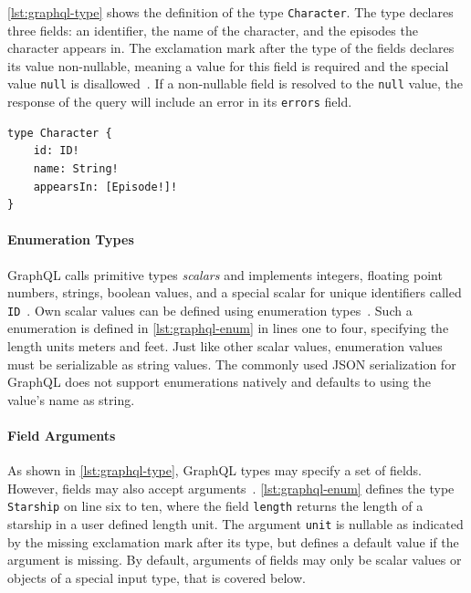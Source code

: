 \autoref{lst:graphql-type} shows the definition of the type \texttt{Character}.
The type declares three fields: an identifier, the name of the character, and the episodes the character appears in.
The exclamation mark after the type of the fields declares its value non-nullable, meaning a value for this field is required and the special value \texttt{null} is disallowed~\cite{Facebook2018}.
If a non-nullable field is resolved to the \texttt{null} value, the response of the query will include an error in its \texttt{errors} field.

\begin{lstlisting}[caption={GraphQL Type Definition}, language=graphqls, label={lst:graphql-type}]
type Character {
    id: ID!
    name: String!
    appearsIn: [Episode!]!
}
\end{lstlisting}


\paragraph{Enumeration Types}

GraphQL calls primitive types \textit{scalars} and implements integers, floating point numbers, strings, boolean values, and a special scalar for unique identifiers called \texttt{ID}~\cite{Facebook2018}.
Own scalar values can be defined using enumeration types~\cite{Diaz2020}.
Such a enumeration is defined in \autoref{lst:graphql-enum} in lines one to four, specifying the length units meters and feet.
Just like other scalar values, enumeration values must be serializable as string values.
The commonly used \ac{JSON} serialization for GraphQL does not support enumerations natively and defaults to using the value's name as string.

\paragraph{Field Arguments}

As shown in \autoref{lst:graphql-type}, GraphQL types may specify a set of fields.
However, fields may also accept arguments~\cite{Diaz2020}.
\autoref{lst:graphql-enum} defines the type \texttt{Starship} on line six to ten, where the field \texttt{length} returns the length of a starship in a user defined length unit.
The argument \texttt{unit} is nullable as indicated by the missing exclamation mark after its type, but defines a default value if the argument is missing.
By default, arguments of fields may only be scalar values or objects of a special input type, that is covered below. 

